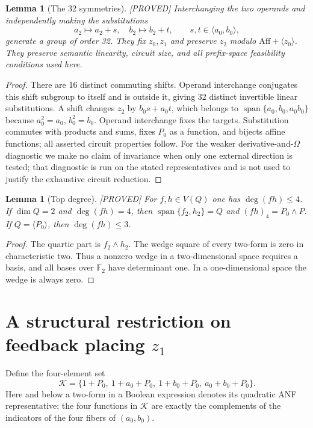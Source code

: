 \documentclass[11pt,a4paper]{article}
\newtheorem{lemma}[theorem]{Lemma}
\newcommand{\F}{\mathbb F_2}
\newcommand{\Aff}{\mathrm{Aff}}
\newcommand{\Span}{\operatorname{span}}
\newcommand{\status}[1]{\hfill\textsf{[#1]}}
\begin{document}
\begin{lemma}[The 32 symmetries]\label{lem:sym}\status{PROVED}
Interchanging the two operands and independently making the substitutions
\[
a_2\mapsto a_2+s,\quad b_2\mapsto b_2+t,
\qquad s,t\in\langle a_0,b_0\rangle,
\]
generate a group of order 32. They fix $z_0,z_1$ and preserve $z_2$ modulo $\Aff+\langle z_0\rangle$. They preserve semantic linearity, circuit size, and all prefix-space feasibility conditions used here.
\end{lemma}
\begin{proof}
There are 16 distinct commuting shifts. Operand interchange conjugates this shift subgroup to itself and is outside it, giving 32 distinct invertible linear substitutions. A shift changes $z_2$ by $b_0s+a_0t$, which belongs to $\Span\{a_0,b_0,a_0b_0\}$ because $a_0^2=a_0$, $b_0^2=b_0$. Operand interchange fixes the targets. Substitution commutes with products and sums, fixes $P_0$ as a function, and bijects affine functions; all asserted circuit properties follow. For the weaker derivative-and-$\Omega$ diagnostic we make no claim of invariance when only one external direction is tested; that diagnostic is run on the stated representatives and is not used to justify the exhaustive circuit reduction.
\end{proof}

\begin{lemma}[Top degree]\label{lem:degree}\status{PROVED}
For $f,h\in V(Q)$ one has $\deg(fh)\le4$. If $\dim Q=2$ and $\deg(fh)=4$, then $\Span\{f_2,h_2\}=Q$ and $(fh)_4=P_0\wedge P$. If $Q=\langle P_0\rangle$, then $\deg(fh)\le3$.
\end{lemma}
\begin{proof}
The quartic part is $f_2\wedge h_2$. The wedge square of every two-form is zero in characteristic two. Thus a nonzero wedge in a two-dimensional space requires a basis, and all bases over $\F$ have determinant one. In a one-dimensional space the wedge is always zero.
\end{proof}

\section[A structural restriction on feedback placing z1]{A structural restriction on feedback placing $z_1$}
Define the four-element set
\[
\mathcal K=\{1+P_0,\ 1+a_0+P_0,\ 1+b_0+P_0,\ a_0+b_0+P_0\}.
\]
Here and below a two-form in a Boolean expression denotes its quadratic ANF representative; the four functions in $\mathcal K$ are exactly the complements of the indicators of the four fibers of $(a_0,b_0)$.
\end{document}

